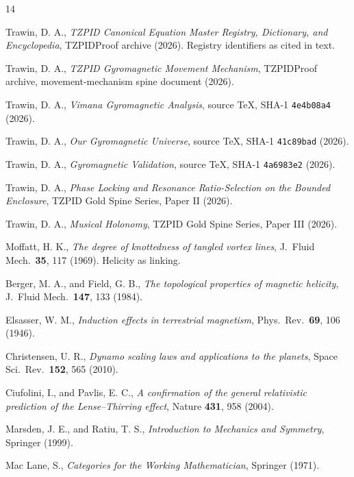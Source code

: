 \documentclass[11pt]{article}
\theoremstyle{remark}
\begin{document}
\begin{thebibliography}{14}

 Trawin, D. A., \emph{TZPID Canonical Equation Master Registry, Dictionary, and Encyclopedia}, TZPIDProof archive (2026). Registry identifiers as cited in text.

 Trawin, D. A., \emph{TZPID Gyromagnetic Movement Mechanism}, TZPIDProof archive, movement-mechanism spine document (2026).

 Trawin, D. A., \emph{Vimana Gyromagnetic Analysis}, source TeX, SHA-1 \texttt{4e4b08a4} (2026).

 Trawin, D. A., \emph{Our Gyromagnetic Universe}, source TeX, SHA-1 \texttt{41c89bad} (2026).

 Trawin, D. A., \emph{Gyromagnetic Validation}, source TeX, SHA-1 \texttt{4a6983e2} (2026).

 Trawin, D. A., \emph{Phase Locking and Resonance Ratio-Selection on the Bounded Enclosure}, TZPID Gold Spine Series, Paper II (2026).

 Trawin, D. A., \emph{Musical Holonomy}, TZPID Gold Spine Series, Paper III (2026).

 Moffatt, H. K., \emph{The degree of knottedness of tangled vortex lines}, J.\ Fluid Mech.\ \textbf{35}, 117 (1969). Helicity as linking.

 Berger, M. A., and Field, G. B., \emph{The topological properties of magnetic helicity}, J.\ Fluid Mech.\ \textbf{147}, 133 (1984).

 Elsasser, W. M., \emph{Induction effects in terrestrial magnetism}, Phys.\ Rev.\ \textbf{69}, 106 (1946).

 Christensen, U. R., \emph{Dynamo scaling laws and applications to the planets}, Space Sci.\ Rev.\ \textbf{152}, 565 (2010).

 Ciufolini, I., and Pavlis, E. C., \emph{A confirmation of the general relativistic prediction of the Lense--Thirring effect}, Nature \textbf{431}, 958 (2004).

 Marsden, J. E., and Ratiu, T. S., \emph{Introduction to Mechanics and Symmetry}, Springer (1999).

 Mac Lane, S., \emph{Categories for the Working Mathematician}, Springer (1971).

\end{thebibliography}
\end{document}
